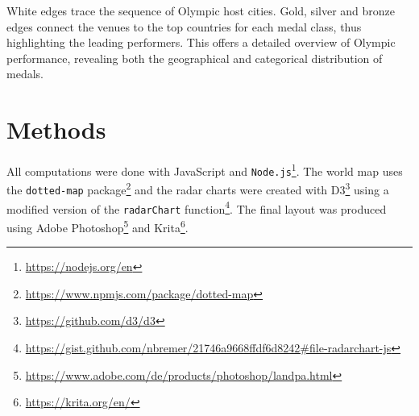 \documentclass{article}
\newcommand{\mono}[1]{\texttt{#1}}%
\begin{document}
White edges trace the sequence of Olympic host cities. Gold, silver and bronze edges connect the venues to the top countries for each medal class, thus highlighting the leading performers. This offers a detailed overview of Olympic performance, revealing both the geographical and categorical distribution of medals.

\section*{Methods}
All computations were done with JavaScript and \mono{Node.js}\footnote{\url{https://nodejs.org/en}}. The world map uses the \mono{dotted-map} package\footnote{\url{https://www.npmjs.com/package/dotted-map}} and the radar charts were created with D3\footnote{\url{https://github.com/d3/d3}} using a modified version of the \mono{radarChart} function\footnote{\url{https://gist.github.com/nbremer/21746a9668ffdf6d8242\#file-radarchart-js}}. The final layout was produced using Adobe Photoshop\footnote{\url{https://www.adobe.com/de/products/photoshop/landpa.html}} and Krita\footnote{\url{https://krita.org/en/}}. 

\endgroup
\end{document}
